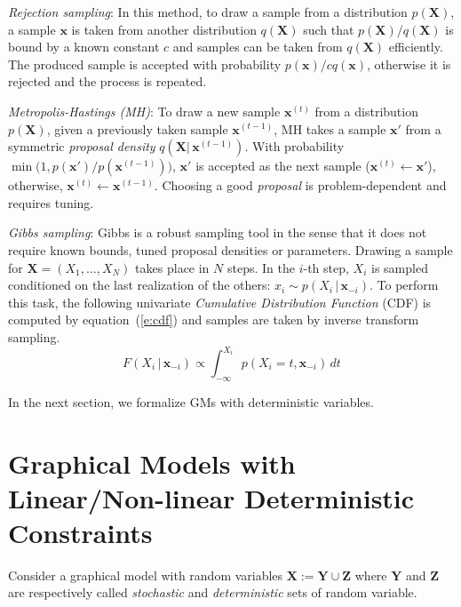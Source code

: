 \documentclass{article}
\newcommand{\bvec}[1]{\textbf{#1}}
\newcommand{\pr}{p}
\begin{document}
\emph{Rejection sampling}: In this method, to draw a sample from 
a distribution $p(\bvec{X})$, a sample $\bvec{x}$ is taken from another distribution $q(\bvec{X})$
such that $p(\bvec{X})/q(\bvec{X})$ is bound by a known constant $c$
and samples can be taken from $q(\bvec{X})$ efficiently.
The produced sample is accepted with probability $p(\bvec{x}) / c q(\bvec{x})$, 
otherwise it is rejected and the process is repeated. 

\emph{Metropolis-Hastings (MH)}:
To draw a new sample $\bvec{x}^{(t)}$ from a distribution $p(\bvec{X})$, given a previously taken sample $\bvec{x}^{(t-1)}$, 
MH takes a sample $\bvec{x}'$ from a symmetric \emph{proposal density} $q(\bvec{X} |\, \bvec{x}^{(t-1)})$. 
With probability $\min \big(1, p(\bvec{x}')/p(\bvec{x}^{(t-1)}) \big)$, 
$\bvec{x}'$ is accepted as the next sample ($\bvec{x}^{(t)} \leftarrow \bvec{x}'$), otherwise, $\bvec{x}^{(t)} \leftarrow \bvec{x}^{(t-1)}$. 
Choosing a good \emph{proposal} is problem-dependent and requires tuning. 


\emph{Gibbs sampling}:
Gibbs is a robust sampling tool in the sense that it does not require known bounds, tuned proposal densities or parameters.
Drawing a sample for $\bvec{X} = (X_1, \ldots, X_N)$ takes place in $N$ steps.
In the $i$-th step, $X_i$ is sampled conditioned on the last realization of the others:
$x_i \sim \pr(X_i \,|\, \bvec{x}_{-i})$. 
To perform this task, the following univariate \emph{Cumulative Distribution Function} (CDF)
is computed by equation~(\ref{e:cdf}) and samples are taken by inverse transform sampling. 
{\footnotesize
\begin{equation}
\label{e:cdf}
F(X_i  \,|\, \bvec{x}_{-i}) 
\propto
\int_{-\infty}^{X_i} \!\!\!\! \pr(X_i = t, \bvec{x}_{-i}) \, d  t
\end{equation} 
}

In the next section, we formalize GMs with deterministic variables. 

\section{Graphical Models with Linear/Non-linear Deterministic Constraints}
Consider a graphical model with random variables $\bvec{X} := \bvec{Y} \cup \bvec{Z}$
where $\bvec{Y}$ and $\bvec{Z}$ are respectively called \emph{stochastic} and \emph{deterministic}  sets of random variable.
\end{document}

